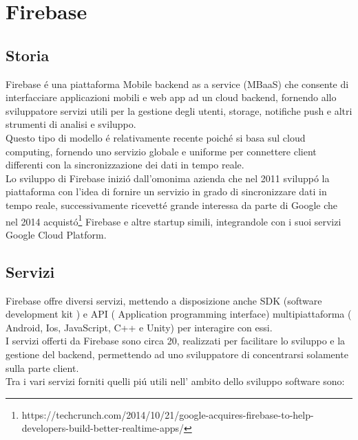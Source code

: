 \chapter{Firebase}                %
\lhead[\fancyplain{}{\bfseries\thepage}]{\fancyplain{}{\bfseries\rightmark}}
\section{Storia}                 %


Firebase \'e una piattaforma Mobile backend as a service (MBaaS) che consente
di interfacciare applicazioni mobili e web app ad un cloud backend, fornendo allo sviluppatore servizi utili per la gestione degli utenti, storage, notifiche push e altri strumenti di analisi e sviluppo.\\
Questo tipo di modello \'e relativamente recente poich\'e si basa sul cloud computing, fornendo uno servizio globale e uniforme per connettere client differenti con la sincronizzazione dei dati in tempo reale.\\
Lo sviluppo di Firebase inizi\'o dall'omonima azienda che nel 2011 svilupp\'o la piattaforma con l'idea di fornire un servizio in grado di sincronizzare dati in tempo reale, successivamente ricevett\'e grande interessa da parte di Google che nel 2014 acquist\'o\footnote{https://techcrunch.com/2014/10/21/google-acquires-firebase-to-help-developers-build-better-realtime-apps/} Firebase e altre startup simili, integrandole con i suoi servizi Google Cloud Platform.





\section{Servizi}                 %
Firebase offre diversi servizi, mettendo a disposizione anche SDK (software development kit ) e API ( Application programming interface) multipiattaforma ( Android, Ios, JavaScript, C++ e Unity) per interagire con essi.\\
I servizi offerti da Firebase sono circa 20, realizzati per facilitare lo sviluppo e la gestione del backend, permettendo ad uno sviluppatore di concentrarsi solamente sulla parte client.\\
Tra i vari servizi forniti quelli pi\'u utili nell' ambito dello sviluppo software sono:


